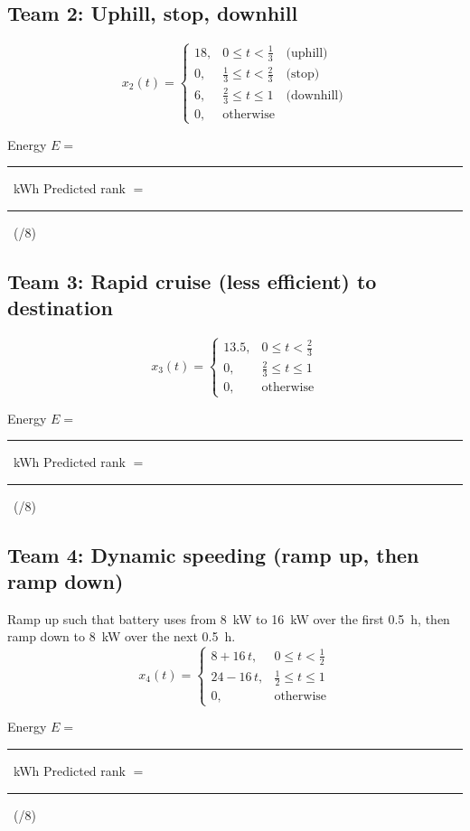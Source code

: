 \documentclass[11pt]{article}
\newcommand{\Eblank}{\rule{3cm}{0.4pt}}
\newcommand{\Rankblank}{\rule{3cm}{0.4pt}}
\begin{document}
\subsection*{Team 2: Uphill, stop, downhill}
\[
x_2(t)=
\begin{cases}
18, & 0 \le t < \tfrac{1}{3} \quad\text{(uphill)}\\
0,  & \tfrac{1}{3} \le t < \tfrac{2}{3} \quad\text{(stop)}\\
6,  & \tfrac{2}{3} \le t \le 1 \quad\text{(downhill)}\\
0,  & \text{otherwise}
\end{cases}
\]
\begin{tcolorbox}[title=Team 2: Record your results]
Energy \(E=\) \Eblank\ \si{kWh} \quad\quad Predicted rank \(=\) \Rankblank\ (/8)
\end{tcolorbox}

\subsection*{Team 3: Rapid cruise (less efficient) to destination}
\[
x_3(t)=
\begin{cases}
13.5, & 0 \le t < \tfrac{2}{3} \\
0,    & \tfrac{2}{3} \le t \le 1 \\
0,    & \text{otherwise}
\end{cases}
\]
\begin{tcolorbox}[title=Team 3: Record your results]
Energy \(E=\) \Eblank\ \si{kWh} \quad\quad Predicted rank \(=\) \Rankblank\ (/8)
\end{tcolorbox}

\subsection*{Team 4: Dynamic speeding (ramp up, then ramp down)}
Ramp up such that battery uses from \SI{8}{kW} to \SI{16}{kW} over the first \SI{0.5}{h}, then ramp down to \SI{8}{kW} over the next \SI{0.5}{h}.
\[
x_4(t)=
\begin{cases}
8 + 16\,t, & 0 \le t < \tfrac{1}{2} \\
24 - 16\,t, & \tfrac{1}{2} \le t \le 1 \\
0, & \text{otherwise}
\end{cases}
\]
\begin{tcolorbox}[title=Team 4: Record your results]
Energy \(E=\) \Eblank\ \si{kWh} \quad\quad Predicted rank \(=\) \Rankblank\ (/8)
\end{tcolorbox}
\end{document}
